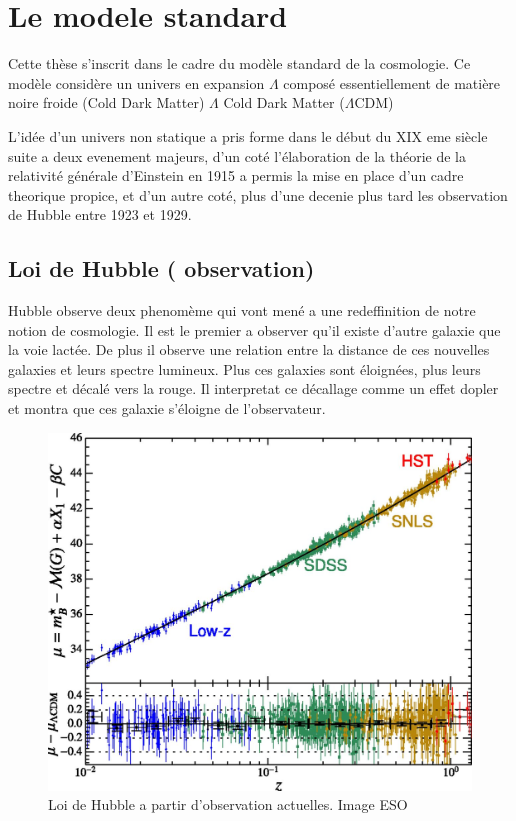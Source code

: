 \chapter{ Le modele standard } \label{ch:introduction_physique}

Cette thèse s'inscrit dans le cadre du modèle standard de la cosmologie.
Ce modèle considère un univers en expansion $\Lambda$ composé essentiellement de matière noire froide (Cold Dark Matter) $\Lambda$ Cold Dark Matter ($\Lambda$CDM)

L'idée d'un univers non statique a pris forme dans le début du XIX eme siècle suite a deux evenement majeurs, d'un coté l'élaboration de la théorie de la relativité générale d'Einstein en 1915 a permis la mise en place d'un cadre theorique propice, et d'un autre coté, plus d'une decenie plus tard les observation de Hubble entre 1923 et 1929.

\section{Loi de Hubble ( observation) }

Hubble observe deux phenomème qui vont mené a une redeffinition de notre notion de cosmologie.
Il est le premier a observer qu'il existe d'autre galaxie que la voie lactée.
De plus il observe une relation entre la distance de ces nouvelles galaxies et leurs spectre lumineux.
Plus ces galaxies sont  éloignées, plus leurs spectre et décalé vers la rouge.
Il interpretat ce décallage comme un effet dopler et montra que ces galaxie s'éloigne de l'observateur.

\begin{figure}[bth]
        \includegraphics[width=.9\linewidth]{img/01/hubble_law.jpg} 
        \caption{Loi de Hubble a partir d'observation actuelles. 
        Image ESO}
 		\label{fig:hubble_law}
\end{figure}

